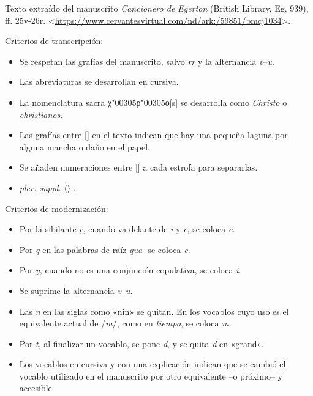 \documentclass[11pt,twoside]{article}
\newcommand{\suppl}[1]{〈#1〉}
\begin{document}
%
Texto extraído del manuscrito \emph{Cancionero de Egerton} (British Library, Eg. 939), ff. 25v-26r. <\url{https://www.cervantesvirtual.com/nd/ark:/59851/bmcj1034}>.\par
%
Criterios de transcripción:
%
\begin{itemize}[label=--]%
\item Se respetan las grafías del manuscrito, salvo \emph{rr} y la alternancia \emph{v}--\emph{u}.\par
\item Las abreviaturas se desarrollan en cursiva.\par
\item La nomenclatura sacra χ{\char"00305}ρ{\char"00305}ο[s] se desarrolla como \emph{Christo} o \emph{christianos}.\par
\item Las grafías entre [] en el texto indican que hay una pequeña laguna por alguna mancha o daño en el papel.\par 
\item Se añaden numeraciones entre [] a cada estrofa para separarlas.\par
\item \emph{pler. suppl.} \suppl{} \textcite{Severin2000}.\par
\end{itemize}\par
\vskip6pt
%
Criterios de modernización:
%
\begin{itemize}[label=--]%
\item Por la sibilante \emph{ç}, cuando va delante de \emph{i} y \emph{e}, se coloca \emph{c}.\par
\item Por \emph{q} en las palabras de raíz \emph{qua}- se coloca \emph{c}.\par
\item Por \emph{y}, cuando no es una conjunción copulativa, se coloca \emph{i}.\par
\item Se suprime la alternancia \emph{v}--\emph{u}.\par
\item Las \emph{n} en las siglas como «nin» se quitan. En los vocablos cuyo uso es el equivalente actual de /\emph{m}/, como en \emph{tiempo}, se coloca \emph{m}.\par
\item Por \emph{t}, al finalizar un vocablo, se pone \emph{d}, y se quita \emph{d} en «grand».\par
\item Los vocablos en cursiva y con una explicación indican que se cambió el vocablo utilizado en el manuscrito por otro equivalente --o próximo-- y accesible.\par
\end{itemize}
%
\end{document}
